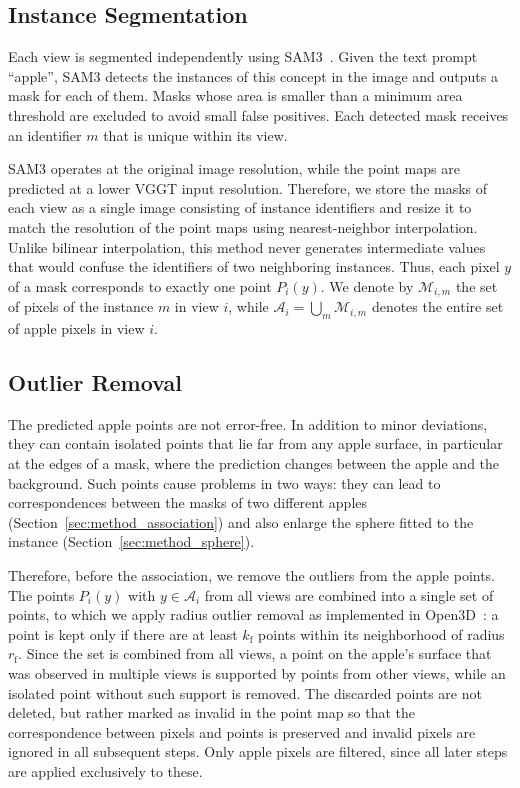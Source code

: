 \documentclass[english, egger, bsc]{vcethesis}
\begin{document}
\subsection{Instance Segmentation}
Each view is segmented independently using SAM3~\cite{carion2026sam3segmentconcepts}. Given the text prompt ``apple'', SAM3 detects the instances of this concept in the image and outputs a mask for each of them. Masks whose area is smaller than a minimum area threshold are excluded to avoid small false positives. Each detected mask receives an identifier $m$ that is unique within its view.

SAM3 operates at the original image resolution, while the point maps are predicted at a lower VGGT input resolution. Therefore, we store the masks of each view as a single image consisting of instance identifiers and resize it to match the resolution of the point maps using nearest-neighbor interpolation. Unlike bilinear interpolation, this method never generates intermediate values that would confuse the identifiers of two neighboring instances. Thus, each pixel $y$ of a mask corresponds to exactly one point $P_i(y)$. We denote by $\mathcal{M}_{i,m}$ the set of pixels of the instance $m$ in view $i$, while $\mathcal{A}_i = \bigcup_m \mathcal{M}_{i,m}$ denotes the entire set of apple pixels in view $i$.

\subsection{Outlier Removal}
\label{sec:method_outlier}
The predicted apple points are not error-free. In addition to minor deviations, they can contain isolated points that lie far from any apple surface, in particular at the edges of a mask, where the prediction changes between the apple and the background. Such points cause problems in two ways: they can lead to correspondences between the masks of two different apples (Section~\ref{sec:method_association}) and also enlarge the sphere fitted to the instance (Section~\ref{sec:method_sphere}).

Therefore, before the association, we remove the outliers from the apple points. The points $P_i(y)$ with $y \in \mathcal{A}_i$ from all views are combined into a single set of points, to which we apply radius outlier removal as implemented in Open3D~\cite{zhou2018open3d}: a point is kept only if there are at least $k_{\mathrm{f}}$ points within its neighborhood of radius $r_{\mathrm{f}}$. Since the set is combined from all views, a point on the apple's surface that was observed in multiple views is supported by points from other views, while an isolated point without such support is removed. 
The discarded points are not deleted, but rather marked as invalid in the point map so that the correspondence between pixels and points is preserved and invalid pixels are ignored in all subsequent steps. Only apple pixels are filtered, since all later steps are applied exclusively to these.
\end{document}
